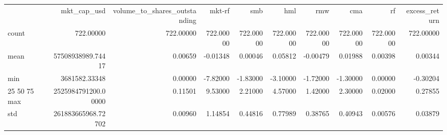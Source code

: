 \begin{tabular}{lrrrrrrrrr}
 & mkt_cap_usd & volume_to_shares_outstanding & mkt-rf & smb & hml & rmw & cma & rf & excess_return \\
count & 722.00000 & 722.00000 & 722.00000 & 722.00000 & 722.00000 & 722.00000 & 722.00000 & 722.00000 & 722.00000 \\
mean & 57508938989.74417 & 0.00659 & -0.01348 & 0.00046 & 0.05812 & -0.00479 & 0.01988 & 0.00398 & 0.00344 \\
min & 3681582.33348 & 0.00000 & -7.82000 & -1.83000 & -3.10000 & -1.72000 & -1.30000 & 0.00000 & -0.30204 \\
25%
50%
75%
max & 2525984791200.00000 & 0.11501 & 9.53000 & 2.21000 & 4.57000 & 1.42000 & 2.30000 & 0.02000 & 0.27855 \\
std & 261883665968.72702 & 0.00960 & 1.14854 & 0.44816 & 0.77989 & 0.38765 & 0.40943 & 0.00576 & 0.03879 \\
\end{tabular}
